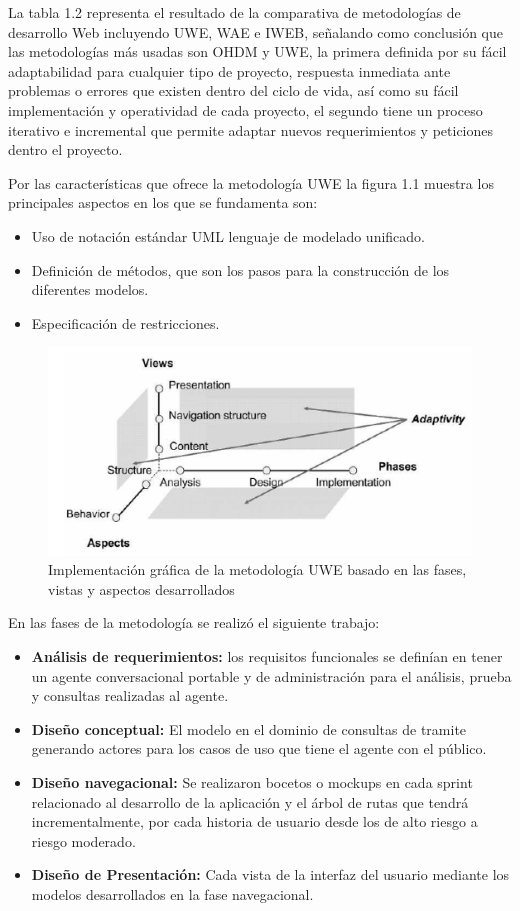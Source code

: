 \documentclass[letter, openright, 12pt]{book}
\newcommand*\setcaptioncitation[1]{\def\captioncitation{\textit{Fuente:}~#1}}
\let\captioncitation\relax
\begin{document}
La tabla 1.2 representa el resultado de la comparativa de metodologías de desarrollo Web incluyendo UWE, WAE e IWEB, señalando como conclusión que las metodologías más usadas son OHDM y UWE, la primera definida por su fácil adaptabilidad para cualquier tipo de proyecto, respuesta inmediata ante problemas o errores que existen dentro del ciclo de vida, así como su fácil implementación y operatividad de cada proyecto, el segundo tiene un proceso iterativo e incremental que permite adaptar nuevos requerimientos y peticiones dentro el proyecto. 
\par
Por las características que ofrece la metodología UWE la figura 1.1 muestra los principales aspectos en los que se fundamenta son: 
\begin{itemize}
\item Uso de notación estándar UML lenguaje de modelado unificado.
\item Definición de métodos, que son los pasos para la construcción de los diferentes modelos.
\item Especificación de restricciones.
\end{itemize}

\begin{figure}[!ht]
\includegraphics[width=1\textwidth]{figura1_1}
\setcaptioncitation{(Schwinger y Koch, 2006)}
\caption{Implementación gráfica de la metodología UWE basado en las fases, vistas y aspectos desarrollados}
\label{tab:figura1_1} 
\end{figure}

En las fases de la metodología se realizó el siguiente trabajo:
\begin{itemize}
\item \textbf{Análisis de requerimientos:} los requisitos funcionales se definían en tener un agente conversacional portable y de administración para el análisis, prueba y consultas realizadas al agente. 
\item \textbf{Diseño conceptual:} El modelo en el dominio de consultas de tramite generando actores para los casos de uso que tiene el agente con el público.
\item \textbf{Diseño navegacional:} Se realizaron bocetos o mockups en cada sprint relacionado al desarrollo de la aplicación y el árbol de rutas que tendrá incrementalmente, por cada historia de usuario desde los de alto riesgo a riesgo moderado.
\item \textbf{Diseño de Presentación:} Cada vista de la interfaz del usuario mediante los modelos desarrollados en la fase navegacional.
\end{itemize}
\end{document}
